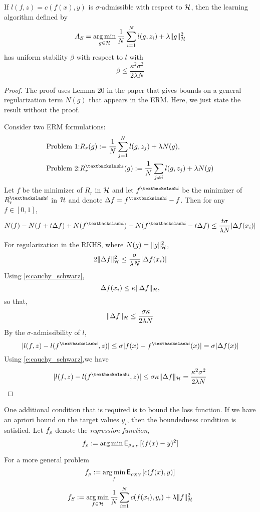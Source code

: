 \noindent \begin{theorem}
	If $l(f,z) = c(f(x),y)$ is $\sigma$-admissible with respect to ${\cal H}$, then the learning algorithm defined by 
	\[
	A_S = \mathop{\rm arg{\,}min}_{g \in {\cal H}} \frac{1}{N} \sum_{i=1}^N l(g, z_i) + \lambda \|g\|^2_{\cal H}
	\]
	has uniform stability $\beta$ with respect to $l$ with
	\[
	\beta \leq \frac{\kappa^2 \sigma^2}{2 \lambda N}
	\]
	\begin{proof}
		The proof uses Lemma 20 in the paper that gives bounds on a general regularization term $N(g)$ that appears in the ERM. Here, we just state the result without the proof. 
		\begin{lemma}
			Consider two ERM formulations:
			\[
			\begin{aligned}
			\text{Problem 1:} & R_r(g) := \frac{1}{N} \sum_{j=1}^N l(g, z_j) + \lambda N(g), \\
			\text{Problem 2:} & R_r^{\textbackslash i}(g) := \frac{1}{N} \sum_{j \neq i} l(g, z_j) + \lambda N(g)
			\end{aligned}
			\]
			Let $f$ be the minimizer of $R_r$ in ${\cal H}$ and let $f^{\textbackslash i}$ be the minimizer of $R_r^{\textbackslash i}$ in ${\cal H}$ and denote $\Delta f = f^{\textbackslash i } - f$. Then for any $f \in [0,1]$,
			\[
			N(f) - N(f+t \Delta f) + N(f^{\textbackslash i}) - N(f^{\textbackslash i} - t \Delta f) \leq \frac{t \sigma}{\lambda N}|\Delta f(x_i)|
			\]
		\end{lemma}
		
		For regularization in the RKHS, where $N(g) = \|g\|^2_{\cal H}$,
		\[
		2 \| \Delta f\|^2_{\cal H} \leq \frac{\sigma}{\lambda N} | \Delta f(x_i)|
		\] 
		Using \eqref{e:cauchy_schwarz}, 
		\[
		\Delta f(x_i) \leq \kappa \|\Delta f \|_{\cal H} ,
		\]
		so that, 
		\[
		\| \Delta f \|_{\cal H} \leq \frac{ \sigma \kappa}{2 \lambda N}
		\]
		By the $\sigma$-admissibility of $l$,
		\[
		| l(f,z) - l(f^{\textbackslash i},z)| \leq \sigma |f(x) - f^{\textbackslash i}(x)| = \sigma |\Delta f(x) |
		\]
		Using \eqref{e:cauchy_schwarz},we have 
		\[
		| l(f,z) - l(f^{\textbackslash i},z)| \leq \sigma \kappa \|\Delta f\|_\clH = \frac{\kappa^2 \sigma^2}{2 \lambda N}
		\]
	\end{proof}
\end{theorem}

One additional condition that is required is to bound the loss function. If we have an apriori bound on the target values $y_i$, then the boundedness condition is satisfied.
Let $f_\rho$ denote the \textit{regression function},
\[
f_\rho := \mathop{\rm arg{\,}min} {\sf E}_{\rho_{XY}}[(f(x) - y)^2]
\]

For a more general problem
\[
f_\rho := \mathop{\rm arg{\,}min}_f {\sf E}_{\rho_{XY}}[c(f(x), y)]
\]
\[
f_S := \mathop{\rm arg{\,}min}_{f \in {\cal H}} \frac{1}{N} \sum_{i=1}^N c(f(x_i), y_i) + \lambda \|f\|^2_{\cal H} 
\]
